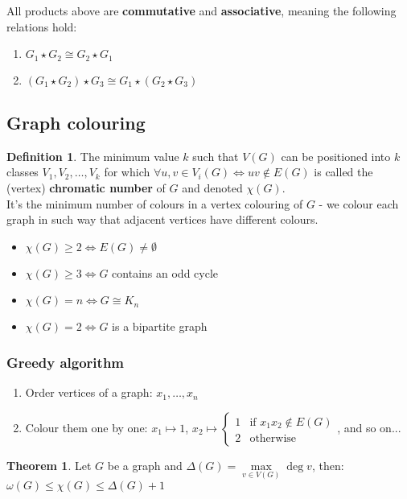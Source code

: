 \documentclass{article}
\theoremstyle{definition}
\newtheorem{theorem}{Theorem}[section]
\newtheorem{dd}{Definition}[section]
\begin{document}
\noindent All products above are \textbf{commutative} and \textbf{associative}, meaning the following relations hold:
\begin{enumerate}
    \item $G_1 \star G_2 \cong G_2 \star G_1$
    \item $(G_1 \star G_2) \star G_3 \cong G_1 \star (G_2 \star G_3)$
\end{enumerate}

\subsection{Graph colouring}

\begin{dd}
    The minimum value $k$ such that $V(G)$ can be positioned into $k$ classes $V_1, V_2, \dots, V_k$ for which $\forall u, v \in V_i(G) \iff uv \notin E(G)$ is called the (vertex) \textbf{chromatic number} of $G$ and denoted $\chi(G)$. \\
    It's the minimum number of colours in a vertex colouring of $G$ - we colour each graph in such way that adjacent vertices have different colours.
    \begin{itemize}
        \item $\chi(G) \geq 2 \iff E(G) \neq \emptyset$
        \item $\chi(G) \geq 3 \iff G$ contains an odd cycle
        \item $\chi(G) = n \iff G \cong K_n$
        \item $\chi(G) = 2 \iff G$ is a bipartite graph
    \end{itemize}
\end{dd}

\subsubsection{Greedy algorithm}
\begin{enumerate}
    \item Order vertices of a graph: $x_1, \dots, x_n$
    \item {
        Colour them one by one:
        $x_1 \mapsto 1$, $x_2 \mapsto \begin{cases}
            1 & \text{if } x_1x_2 \notin E(G) \\
            2 & \text{otherwise}
        \end{cases}$, and so on...
    }
\end{enumerate}

\begin{theorem}
    Let $G$ be a graph and $\Delta(G) = \max\limits_{v \in V(G)}\deg v$, then: $\omega(G) \leq \chi(G) \leq \Delta(G) + 1$
\end{theorem}
\end{document}
